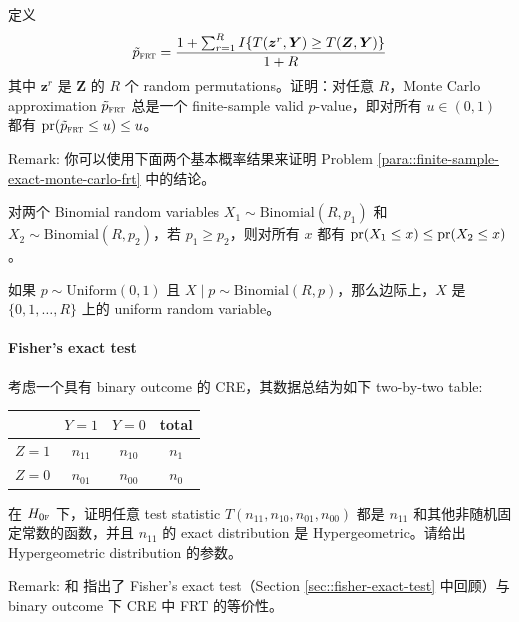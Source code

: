 定义
$$
\tilde p_{\textsc{frt}}  =  \frac{  1 + \sum_{r=1}^R   I\{ T(\boldsymbol{z}^r,\boldsymbol{Y})   \geq T(\boldsymbol{Z},\boldsymbol{Y})   \}  }{1+R}
$$ 
其中 $\boldsymbol{z}^r$ 是 $\boldsymbol{Z}$ 的 $R$ 个 random permutations。证明：对任意 $R$，Monte Carlo approximation $\tilde p_{\textsc{frt}} $ 总是一个 finite-sample valid $p$-value，即对所有 $u\in (0,1)$ 都有 $\textup{pr}(\tilde p_{\textsc{frt}} \leq u) \leq u$。


 
Remark: 你可以使用下面两个基本概率结果来证明 Problem \ref{para::finite-sample-exact-monte-carlo-frt} 中的结论。


\begin{lemma}
\label{lemma::binomial-order}
对两个 Binomial random variables $X_1\sim \text{Binomial}(R, p_1)$ 和 $X_2\sim \text{Binomial}(R, p_2)$，若 $p_1\geq p_2$，则对所有 $x$ 都有 $\textup{pr}(X_1\leq x) \leq  \textup{pr}(X_2\leq x) $。
\end{lemma}

\begin{lemma}
\label{lemma::uniform}
如果 $p\sim \text{Uniform}(0,1)$ 且 $X\mid p \sim \text{Binomial}(R, p)$，那么边际上，$X$ 是 $\{ 0,1,\ldots, R  \}$ 上的 uniform random variable。
\end{lemma}

 


\paragraph{Fisher's exact test}
\label{hw::frt-fisherexacttest}

考虑一个具有 binary outcome 的 CRE，其数据总结为如下 two-by-two table:
 \begin{center}
\begin{tabular}{lccc}
\hline 
        & $Y =1$ & $Y =0$& total\\\hline
$Z =1$ & $n_{11}$ & $n_{10}$ & $n_1$\\ 
$Z =0$ & $n_{01}$ & $n_{00}$ & $n_0$\\ 
\hline 
\end{tabular}
\end{center}
在 $H_{0\textsc{f}}$ 下，证明任意 test statistic $T(n_{11}, n_{10}, n_{01}, n_{00})$ 都是 $n_{11}$ 和其他非随机固定常数的函数，并且 $n_{11}$ 的 exact distribution 是 Hypergeometric。请给出 Hypergeometric distribution 的参数。

Remark:
\citet{barnard1947significance} 和 \citet{Ding:2015} 指出了 Fisher's exact test（Section \ref{sec::fisher-exact-test} 中回顾）与 binary outcome 下 CRE 中 FRT 的等价性。





